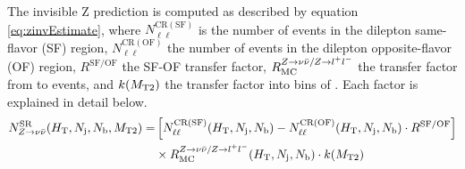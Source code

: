The invisible Z prediction is computed as described by equation \ref{eq:zinvEstimate}, where $N_{\ell\ell}^{\mathrm{CR(SF)}}$ is the number of events in the dilepton same-flavor (SF) region, $N_{\ell\ell}^{\mathrm{CR(OF)}}$ the number of events in the dilepton opposite-flavor (OF) region, $R^{\mathrm{SF/OF}}$ the SF-OF transfer factor, $R_{\mathrm{MC}}^{Z\rightarrow\nu\bar{\nu} / Z\rightarrow l^+ l^-}$ the transfer factor from \zll to \znunu events, and $k(M_{\mathrm{T2}})$ the transfer factor into bins of \mttwo. Each factor is explained in detail below. 
\begin{align}
		N_{Z\rightarrow\nu\bar{\nu}}^{\mathrm{SR}}(H_{\mathrm{T}},N_\mathrm{j},N_\mathrm{b},M_{\mathrm{T2}}) =& \left[ N_{\ell\ell}^{\mathrm{CR(SF)}}(H_{\mathrm{T}},N_\mathrm{j},N_\mathrm{b}) - N_{\ell\ell}^{\mathrm{CR(OF)}}(H_{\mathrm{T}},N_\mathrm{j},N_\mathrm{b}) \cdot R^{\mathrm{SF/OF}} \right] \nonumber \\
		& \times R_{\mathrm{MC}}^{Z\rightarrow\nu\bar{\nu} / Z\rightarrow l^+ l^-}(H_{\mathrm{T}},N_\mathrm{j},N_\mathrm{b}) \cdot k(M_{\mathrm{T2}})
	\label{eq:zinvEstimate}
\end{align}

